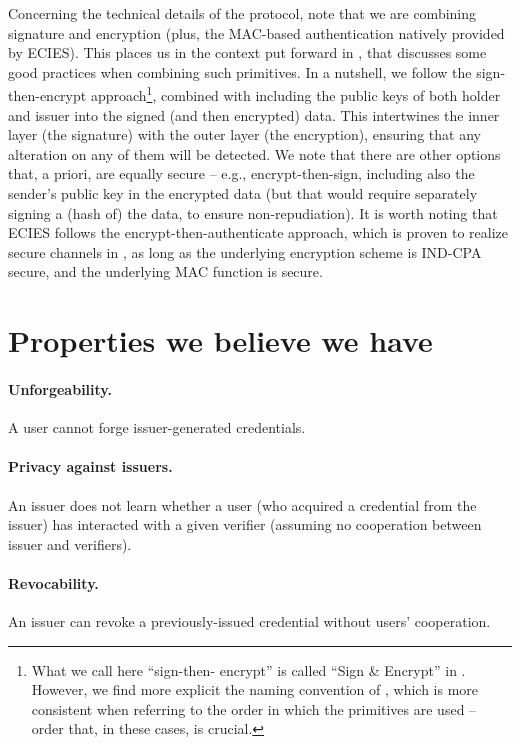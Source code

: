 \documentclass[10pt,a4paper]{article}
\begin{document}
Concerning the technical details of the protocol, note that we are combining
signature and encryption (plus, the MAC-based authentication natively provided
by ECIES). This places us in the context put forward in \cite{davi01}, that
discusses some good practices when combining such primitives. In a nutshell,
we follow the sign-then-encrypt approach\footnote{What we call here ``sign-then-
  encrypt'' is called ``Sign \& Encrypt'' in \cite{davi01}. However, we find
  more explicit the naming convention of \cite{kraw01}, which is more consistent
  when referring to the order in which the primitives are used -- order that, in
  these cases, is crucial.}, combined with including the public
keys of both holder and issuer into the signed (and then encrypted) data.
This intertwines the inner layer (the signature) with the outer layer (the
encryption), ensuring that any alteration on any of them will be detected.
We note that there are other options that, a priori, are equally secure -- e.g.,
encrypt-then-sign, including also the sender's public key in the encrypted data
(but that would require separately signing a (hash of) the data, to ensure
non-repudiation). It is worth noting that ECIES follows the
encrypt-then-authenticate approach, which is proven to realize secure channels
in \cite{kraw01}, as long as the underlying encryption scheme is IND-CPA secure,
and the underlying MAC function is secure.


\section{Properties we believe we have}

\paragraph{Unforgeability.} A user cannot forge issuer-generated credentials.
\paragraph{Privacy against issuers.} An issuer does not learn whether a user (who acquired a credential from the issuer) has interacted with a given verifier (assuming no cooperation between issuer and verifiers).
\paragraph{Revocability.} An issuer can revoke a previously-issued credential without users’ cooperation.
\end{document}
